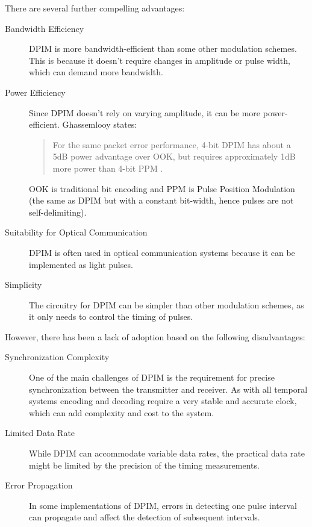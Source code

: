 \documentclass{article}
\begin{document}
There are several further compelling advantages:

\begin{description}

\item [Bandwidth Efficiency] DPIM is more bandwidth-efficient than some other modulation schemes. This is because it doesn't require changes in amplitude or pulse width, which can demand more bandwidth.
\item [Power Efficiency] Since DPIM doesn't rely on varying amplitude, it can be more power-efficient. Ghassemlooy states:

\begin{quote}
For the same packet error performance, 4-bit DPIM has about a 5dB power advantage over OOK, but requires approximately 1dB more power than 4-bit PPM \cite{ghassemlooy2000digital}.
\end{quote}

OOK is traditional bit encoding and PPM is Pulse Position Modulation (the same as DPIM but with a constant bit-width, hence pulses are not self-delimiting).

\item [Suitability for Optical Communication] DPIM is often used in optical communication systems because it can be implemented as light pulses.
\item [Simplicity] The circuitry for DPIM can be simpler than other modulation schemes, as it only needs to control the timing of pulses.
\end{description}

However, there has been a lack of adoption based on the following disadvantages:

\begin{description}

\item[Synchronization Complexity] One of the main challenges of DPIM is the requirement for precise synchronization between the transmitter and receiver. As with all temporal systems encoding and decoding require a very stable and accurate clock, which can add complexity and cost to the system.
\item[Limited Data Rate] While DPIM can accommodate variable data rates, the practical data rate might be limited by the precision of the timing measurements.
\item[Error Propagation] In some implementations of DPIM, errors in detecting one pulse interval can propagate and affect the detection of subsequent intervals.
\end{description}
\end{document}
